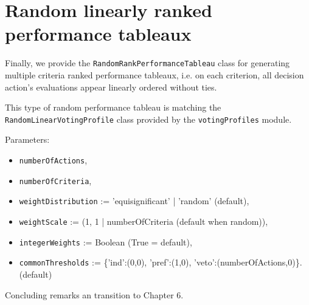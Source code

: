 \section{Random linearly ranked performance tableaux}
\label{sec:5.6}

Finally, we provide the \texttt{RandomRankPerformanceTableau} class for generating multiple criteria ranked performance tableaux, i.e. on each criterion, all decision action's evaluations appear linearly ordered without ties.

This type of random performance tableau is matching the \texttt{RandomLinearVotingProfile} class provided by the \texttt{votingProfiles} module.  
        
Parameters:
\begin{itemize}
\item \texttt{numberOfActions},
\item \texttt{numberOfCriteria},
\item \texttt{weightDistribution} := 'equisignificant' | 'random' (default),
\item \texttt{weightScale} := (1, 1 | numberOfCriteria (default when random)),
\item \texttt{integerWeights} := Boolean (True = default),
\item \texttt{commonThresholds} := \{'ind':(0,0), 'pref':(1,0), 'veto':(numberOfActions,0)\}. (default) 
\end{itemize}


Concluding remarks an transition to Chapter 6. 